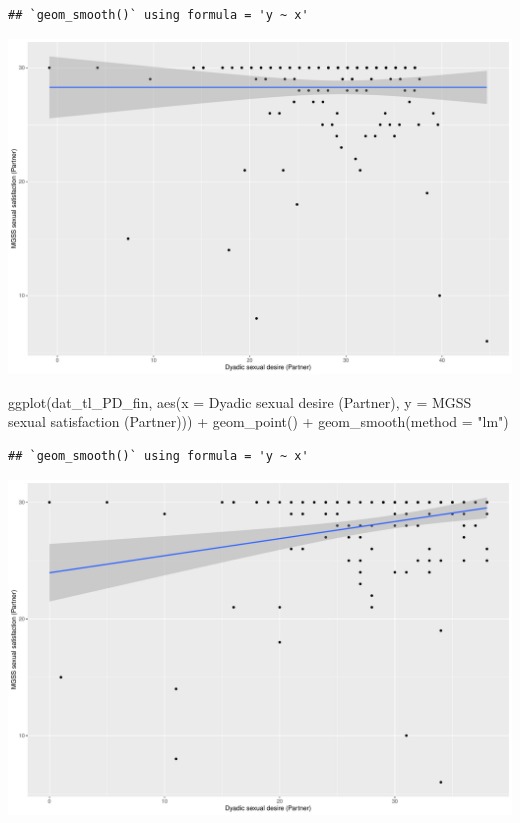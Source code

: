 \documentclass[
  bookmarksnumbered]{article}
\newenvironment{Shaded}{\begin{snugshade}}{\end{snugshade}}
\newcommand{\AttributeTok}[1]{\textcolor[rgb]{0.80,0.80,0.80}{#1}}
\newcommand{\FunctionTok}[1]{\textcolor[rgb]{0.94,0.94,0.56}{#1}}
\newcommand{\NormalTok}[1]{\textcolor[rgb]{0.80,0.80,0.80}{#1}}
\newcommand{\SpecialCharTok}[1]{\textcolor[rgb]{0.86,0.64,0.64}{#1}}
\newcommand{\StringTok}[1]{\textcolor[rgb]{0.80,0.58,0.58}{#1}}
\begin{document}
\begin{verbatim}
## `geom_smooth()` using formula = 'y ~ x'
\end{verbatim}

\includegraphics{Sexual_Desire_Arousal_V2_files/figure-latex/unnamed-chunk-14-2.pdf}

\begin{Shaded}
\begin{Highlighting}[]
\FunctionTok{ggplot}\NormalTok{(dat\_tl\_PD\_fin, }\FunctionTok{aes}\NormalTok{(}\AttributeTok{x =} \StringTok{\textasciigrave{}}\AttributeTok{Dyadic sexual desire (Partner)}\StringTok{\textasciigrave{}}\NormalTok{, }\AttributeTok{y =} \StringTok{\textasciigrave{}}\AttributeTok{MGSS sexual satisfaction (Partner)}\StringTok{\textasciigrave{}}\NormalTok{)) }\SpecialCharTok{+}
  \FunctionTok{geom\_point}\NormalTok{() }\SpecialCharTok{+}
  \FunctionTok{geom\_smooth}\NormalTok{(}\AttributeTok{method =} \StringTok{"lm"}\NormalTok{)}
\end{Highlighting}
\end{Shaded}

\begin{verbatim}
## `geom_smooth()` using formula = 'y ~ x'
\end{verbatim}

\includegraphics{Sexual_Desire_Arousal_V2_files/figure-latex/unnamed-chunk-14-3.pdf}
\end{document}
